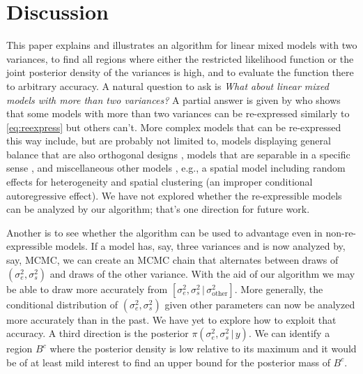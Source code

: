 \documentclass{report}
\newcommand{\sigssq}{\sigma_s^2}
\newcommand{\sigesq}{\sigma_e^2}
\newcommand{\g}{\,|\,}
\newcommand{\argmax}{\operatornamewithlimits{argmax}}
\begin{document}

\section{Discussion}
This paper explains and illustrates an algorithm for linear mixed models with two variances, to find all regions where either the restricted likelihood function or the joint posterior density of the variances is high, and to evaluate the function there to arbitrary accuracy.  A natural question to ask is \emph{What about linear mixed models with more than two variances?}  A partial answer is given by \cite{hodges:2013} who shows that some models with more than two variances can be re-expressed similarly to \eqref{eq:reexpress} but others can't.  More complex models that can be re-expressed this way include, but are probably not limited to, models displaying general balance that are also orthogonal designs \citep[all balanced ANOVAs plus other models;][]{houtman_speed:1983}, models that are separable in a specific sense \citep[Section 17.1.5]{hodges:2013}, and miscellaneous other models \citep[Section 17.1.5]{hodges:2013}, e.g., a spatial model including random effects for heterogeneity and spatial clustering (an improper conditional autoregressive effect). We have not explored whether the re-expressible models can be analyzed by our algorithm; that's one direction for future work.  

Another is to see whether the algorithm can be used to advantage even in non-re-expressible models.  If a model has, say, three variances and is now analyzed by, say, MCMC, we can create an MCMC chain that alternates between draws of $(\sigesq,\sigssq)$ and draws of the other variance.  With the aid of our algorithm we may be able to draw more accurately from $[\sigesq,\sigssq\g \sigma^2_\text{other}]$.  More generally, the conditional distribution of $(\sigesq,\sigssq)$ given other parameters can now be analyzed more accurately than in the past.  We have yet to explore how to exploit that accuracy.  A third direction is the posterior $\pi(\sigesq,\sigssq\g y)$.  We can identify a region $B^c$ where the posterior density is low relative to its maximum and it would be of at least mild interest to find an upper bound for the posterior mass of $B^c$.
\end{document}
